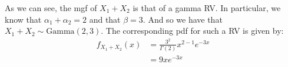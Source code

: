\documentclass{article}
\begin{document}
As we can see, the mgf of $X_1+X_2$ is that of a gamma RV. In particular, we know that $\alpha_1+\alpha_2=2$ and that $\beta=3$. And so we have that $X_1+X_2\sim\text{Gamma}(2,3)$. The corresponding pdf for such a RV is given by:
\begin{align*}
  f_{X_1+X_2}(x)&=\frac{3^2}{\Gamma(2)}x^{2-1}e^{-3x}\tag{pdf of gamma RV}\\
  &\boxed{=9xe^{-3x}}
\end{align*}
\smallskip
\end{document}
